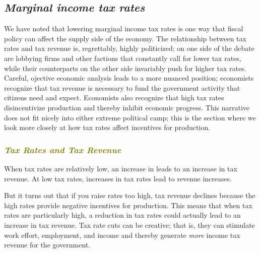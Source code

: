 \documentclass[11pt]{article} %
\begin{document}
\subsection*{\textbf{\textit{Marginal income tax rates}}}
We have noted that lowering marginal income tax rates is one way that fiscal policy can affect the supply side of the economy. The relationship between tax rates and tax revenue is, regrettably, highly politicized; on one side of the debate are lobbying firms and other factions that constantly call for lower tax rates, while their counterparts on the other side invariably push for higher tax rates. Careful, ojective economic analysis leads to a more nuanced position; economists recognize that tax revenue is necessary to fund the government activity that citizens need and expect. Economists also recognize that high tax rates disincentivize production and thereby inhibit economic progress. This narrative does not fit nicely into either extreme political camp; this is the section where we look more closely at how tax rates affect incentives for production.

\subsubsection*{\textit{\textcolor{olive}{Tax Rates and Tax Revenue}}}
When tax rates are relatively low, an increase in leads to an increase in tax revenue. At low tax rates, increases in tax rates lead to revenue increases.

But it turns out that if you raise rates too high, tax revenue declines because the high rates provide negative incentives for production. This means that when tax rates are particularly high, a reduction in tax rates could actually lead to an increase in tax revenue. Tax rate cuts can be creative; that is, they can stimulate work effort, employment, and income and thereby generate \textit{more} income tax revenue for the government.
\end{document}
